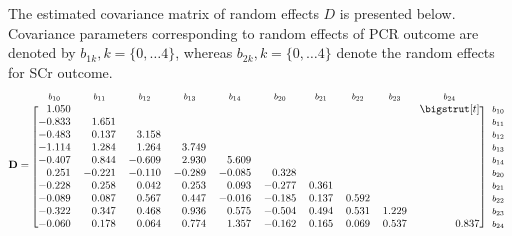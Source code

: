 The estimated covariance matrix of random effects $D$ is presented below. Covariance parameters corresponding to random effects of PCR outcome are denoted by $b_{1k}, k=\{0, \ldots 4\}$, whereas $b_{2k}, k=\{0, \ldots 4\}$ denote the random effects for SCr outcome.
 \begin{equation*}
  \mathbf{D}=
  \begin{blockarray}{*{10}{r} l}
    \begin{block}{*{10}{>{$\footnotesize}c<{$}} l}
      $b_{10}$ & $b_{11}$ & $b_{12}$ & $b_{13}$ & $b_{14}$ & $b_{20}$ & $b_{21}$ & $b_{22}$ & $b_{23}$ & $b_{24}$ & \\
    \end{block}
    \begin{block}{[*{10}{r}]>{$\footnotesize}l<{$}}
      1.050 &  &  &   &  &   &  &  &  &  \bigstrut[t]& $b_{10}$ \\
      -0.833 &  1.651 &   &   &   &  &   &   &   &   & $b_{11}$ \\
      -0.483 &  0.137 &  3.158 &    &  &  &   &  &   &  & $b_{12}$ \\
      -1.114 &  1.284 &  1.264 &  3.749  &   & &   &   &   &  & $b_{13}$ \\
      -0.407 &  0.844 & -0.609 &  2.930  &  5.609 &  &   &  &  &  & $b_{14}$ \\
      0.251 & -0.221 & -0.110 & -0.289  & -0.085 &  0.328 &  & & & & $b_{20}$\\
      -0.228 &  0.258 &  0.042 &  0.253  &  0.093 & -0.277 &  0.361 & & & & $b_{21}$\\
      -0.089 &  0.087 &  0.567 &  0.447  & -0.016 & -0.185 &  0.137 &  0.592 & & & $b_{22}$\\
      -0.322 &  0.347 &  0.468 &  0.936  &  0.575 & -0.504 &  0.494 &  0.531 &  1.229 & & $b_{23}$\\
      -0.060 &  0.178 &  0.064 &  0.774  &  1.357 & -0.162 &  0.165 &  0.069 &  0.537 &  0.837 & $b_{24}$\\
    \end{block}
  \end{blockarray}
\end{equation*}

